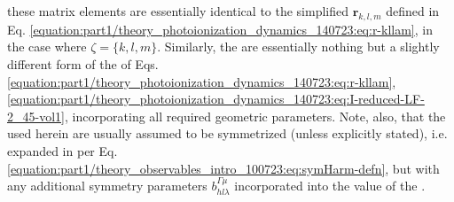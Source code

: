 \documentclass[letterpaper,table,10pt,english]{jupyterBook}
\begin{document}
these matrix elements are essentially identical to the simplified {\hyperref[\detokenize{backmatter/glossary:term-radial-matrix-elements}]{}}
\(\mathbf{r}_{k,l,m}\) defined in Eq. \eqref{equation:part1/theory_photoionization_dynamics_140723:eq:r-kllam}, in the case where \(\zeta=\{k,l,m\}\). Similarly, the {\hyperref[\detokenize{backmatter/glossary:term-channel-functions}]{}} are essentially nothing but a slightly different form of the {\hyperref[\detokenize{backmatter/glossary:term-geometric-coupling-parameters}]{}} of Eqs. \eqref{equation:part1/theory_photoionization_dynamics_140723:eq:r-kllam}, \eqref{equation:part1/theory_photoionization_dynamics_140723:eq:I-reduced-LF-2_45-vol1}, incorporating all required geometric parameters.
Note, also, that the {\hyperref[\detokenize{backmatter/glossary:term-radial-matrix-elements}]{}} used herein are usually assumed to be symmetrized (unless explicitly stated), i.e. expanded in {\hyperref[\detokenize{backmatter/glossary:term-symmetrized-harmonics}]{}} per Eq. \eqref{equation:part1/theory_observables_intro_100723:eq:symHarm-defn}, but with any additional symmetry parameters \(b_{hl\lambda}^{\Gamma\mu}\) incorporated into the value of the {\hyperref[\detokenize{backmatter/glossary:term-radial-matrix-elements}]{}}.
\end{document}
